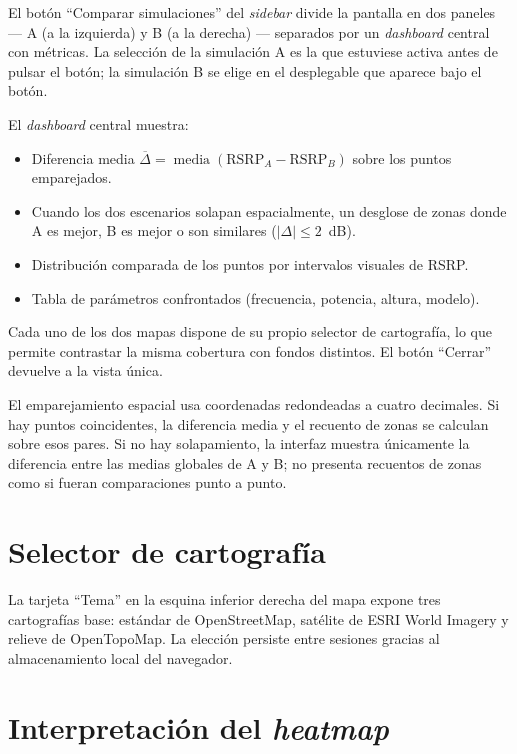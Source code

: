 El botón ``Comparar simulaciones'' del \textit{sidebar} divide la pantalla en
dos paneles --- A (a la izquierda) y B (a la derecha) --- separados por un
\textit{dashboard} central con métricas. La selección de la simulación A es la
que estuviese activa antes de pulsar el botón; la simulación B se elige en el
desplegable que aparece bajo el botón.

El \textit{dashboard} central muestra:
\begin{itemize}
\item Diferencia media $\overline{\Delta} = \operatorname{media}(\text{RSRP}_A-\text{RSRP}_B)$ sobre los puntos emparejados.
\item Cuando los dos escenarios solapan espacialmente, un desglose de zonas
  donde A es mejor, B es mejor o son similares ($|\Delta| \leq 2$~dB).
\item Distribución comparada de los puntos por intervalos visuales de RSRP.
\item Tabla de parámetros confrontados (frecuencia, potencia, altura, modelo).
\end{itemize}

Cada uno de los dos mapas dispone de su propio selector de cartografía, lo que
permite contrastar la misma cobertura con fondos distintos. El botón
``Cerrar'' devuelve a la vista única.

El emparejamiento espacial usa coordenadas redondeadas a cuatro decimales. Si hay puntos
coincidentes, la diferencia media y el recuento de zonas se calculan sobre esos pares. Si
no hay solapamiento, la interfaz muestra únicamente la diferencia entre las medias globales
de A y B; no presenta recuentos de zonas como si fueran comparaciones punto a punto.

\section{Selector de cartografía}
\label{sec:manual_cartografia}

La tarjeta ``Tema'' en la esquina inferior derecha del mapa expone tres
cartografías base: estándar de OpenStreetMap, satélite de ESRI World Imagery y
relieve de OpenTopoMap. La elección persiste entre sesiones gracias al
almacenamiento local del navegador.

\section{Interpretación del \textit{heatmap}}
\label{sec:manual_interpretacion}

